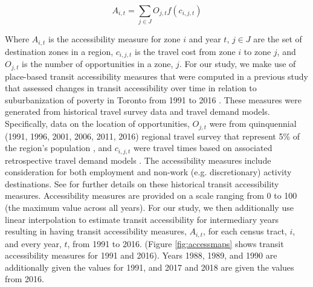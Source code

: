 \begin{equation}
A_{i,t} = \sum_{j \in J} O_{j,t} f(c_{i,j,t})
\end{equation}
\vspace{2mm}

Where $A_{i,t}$ is the accessibility measure for zone $i$ and year $t$, $j \in J$ are the set of destination zones in a region, $c_{i,j,t}$ is the travel cost from zone $i$ to zone $j$, and $O_{j,t}$ is the number of opportunities in a zone, $j$. For our study, we make use of place-based transit accessibility measures that were computed in a previous study that assessed changes in transit accessibility over time in relation to suburbanization of poverty in Toronto from 1991 to 2016 \cite{allen_suburbanization_2021}. These measures were generated from historical travel survey data and travel demand models. Specifically, data on the location of opportunities, $O_{j,t}$ were from quinquennial (1991, 1996, 2001, 2006, 2011, 2016) regional travel survey that represent 5\% of the region's population \cite{ashby_transportation_2016}, and $c_{i,j,t}$ were travel times based on associated retrospective travel demand models \cite{tmg_gtamodel_2016}. The accessibility measures include consideration for both employment and non-work (e.g. discretionary) activity destinations. See  for further details on these historical transit accessibility measures. Accessibility measures are provided on a scale ranging from 0 to 100 (the maximum value across all years). For our study, we then additionally use linear interpolation to estimate transit accessibility for intermediary years resulting in having transit accessibility measures, $A_{i,t}$, for each census tract, $i$, and every year, $t$, from 1991 to 2016. (Figure \ref{fig:accessmaps} shows transit accessibility measures for 1991 and 2016). Years 1988, 1989, and 1990 are additionally given the values for 1991, and 2017 and 2018 are given the values from 2016. 

